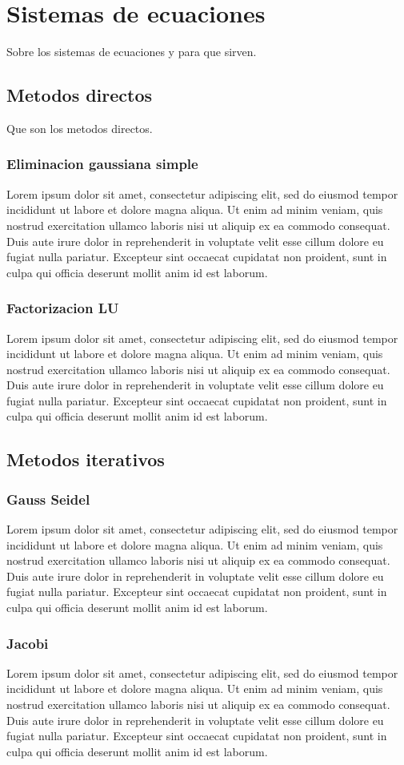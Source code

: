 \documentclass[11pt]{article}
\begin{document}
\newpage
\section{Sistemas de ecuaciones}
Sobre los sistemas de ecuaciones y para que sirven.
\subsection{Metodos directos}
Que son los metodos directos.
\subsubsection{Eliminacion gaussiana simple}
Lorem ipsum dolor sit amet, consectetur adipiscing elit, sed do eiusmod tempor incididunt ut labore et dolore magna aliqua. Ut enim ad minim veniam, quis nostrud exercitation ullamco laboris nisi ut aliquip ex ea commodo consequat. Duis aute irure dolor in reprehenderit in voluptate velit esse cillum dolore eu fugiat nulla pariatur. Excepteur sint occaecat cupidatat non proident, sunt in culpa qui officia deserunt mollit anim id est laborum.
\subsubsection{Factorizacion LU}
Lorem ipsum dolor sit amet, consectetur adipiscing elit, sed do eiusmod tempor incididunt ut labore et dolore magna aliqua. Ut enim ad minim veniam, quis nostrud exercitation ullamco laboris nisi ut aliquip ex ea commodo consequat. Duis aute irure dolor in reprehenderit in voluptate velit esse cillum dolore eu fugiat nulla pariatur. Excepteur sint occaecat cupidatat non proident, sunt in culpa qui officia deserunt mollit anim id est laborum.
\subsection{Metodos iterativos}
\subsubsection{Gauss Seidel}
Lorem ipsum dolor sit amet, consectetur adipiscing elit, sed do eiusmod tempor incididunt ut labore et dolore magna aliqua. Ut enim ad minim veniam, quis nostrud exercitation ullamco laboris nisi ut aliquip ex ea commodo consequat. Duis aute irure dolor in reprehenderit in voluptate velit esse cillum dolore eu fugiat nulla pariatur. Excepteur sint occaecat cupidatat non proident, sunt in culpa qui officia deserunt mollit anim id est laborum.
\subsubsection{Jacobi}
Lorem ipsum dolor sit amet, consectetur adipiscing elit, sed do eiusmod tempor incididunt ut labore et dolore magna aliqua. Ut enim ad minim veniam, quis nostrud exercitation ullamco laboris nisi ut aliquip ex ea commodo consequat. Duis aute irure dolor in reprehenderit in voluptate velit esse cillum dolore eu fugiat nulla pariatur. Excepteur sint occaecat cupidatat non proident, sunt in culpa qui officia deserunt mollit anim id est laborum.
\end{document}
